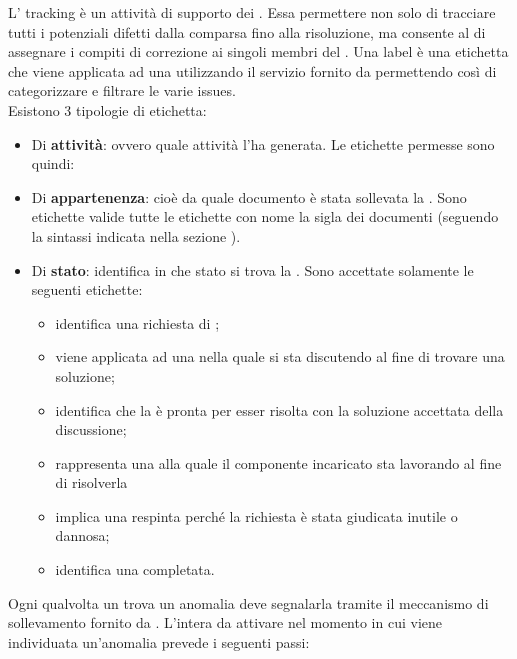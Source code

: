 		L' tracking è un attività di supporto dei . Essa permettere non solo di tracciare tutti i potenziali difetti dalla comparsa fino alla risoluzione, ma consente al  di assegnare i compiti di correzione ai singoli membri del .
				 \label{sec:SintassiLabel}
				Una label è una etichetta che viene applicata ad una  utilizzando il servizio fornito da  permettendo così di categorizzare e filtrare le varie issues.\\
				Esistono 3 tipologie di etichetta:
				\begin{itemize}
				    \item Di \textbf{attività}: ovvero quale attività l'ha generata. Le etichette permesse sono quindi: 
				    \item Di \textbf{appartenenza}: cioè da quale documento è stata sollevata la . Sono etichette valide tutte le etichette con nome la sigla dei documenti (seguendo la sintassi indicata nella sezione ).
				    \item Di \textbf{stato}: identifica in che stato si trova la . Sono accettate solamente le seguenti etichette:
				\begin{itemize}
				    \item {} identifica una richiesta di ;
				    \item {} viene applicata ad una  nella quale si sta discutendo al fine di trovare una soluzione;
				    \item {} identifica che la  è pronta per esser risolta con la soluzione accettata della discussione;
				    \item {} rappresenta una  alla quale il componente incaricato sta lavorando al fine di risolverla
				    \item {} implica una  respinta perché la richiesta è stata giudicata inutile o dannosa;
				    \item {} identifica una  completata.
				\end{itemize}
				\end{itemize}
				Ogni qualvolta un  trova un anomalia deve segnalarla tramite il meccanismo di sollevamento  fornito da . L'intera  da attivare nel momento in cui viene individuata un'anomalia prevede i seguenti passi:
